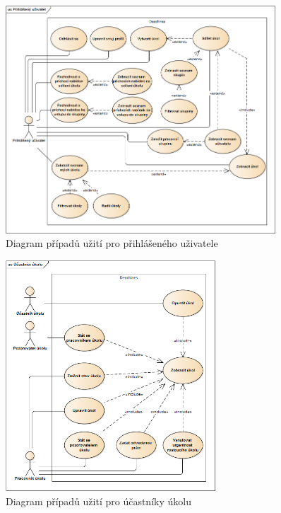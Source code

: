 \documentclass[thesis=B,czech]{FITthesis}[2012/06/26]
\begin{document}
\begin{description}
					
				\begin{figure}\centering
					\includegraphics[width=0.9\textwidth]{ea-diagrams/uc-logged-user.png}
					\caption[Případy užití přihlášeného uživatele]{Diagram případů užití pro přihlášeného uživatele}
					\label{diagram:uc-logged-user}
				\end{figure}
				
				\begin{figure}\centering
					\includegraphics[width=0.7\textwidth]{ea-diagrams/uc-task-members.png}
					\caption[Případy užití účastníky úkolu]{Diagram případů užití pro účastníky úkolu}
					\label{diagram:uc-task-members}
				\end{figure}
				

\end{description}
\end{document}
